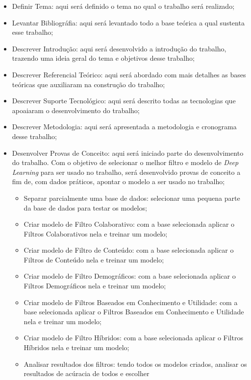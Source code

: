 \begin{itemize}
\item Definir Tema: aqui será definido o tema no qual o trabalho será realizado;
\item Levantar Bibliográfia: aqui será levantado todo a base teórica a qual sustenta esse trabalho;
\item Descrever Introdução: aqui será desenvolvido a introdução do trabalho, trazendo uma ideia geral do tema e objetivos 
desse trabalho;
\item Descrever Referencial Teórico: aqui será abordado com mais detalhes as bases teóricas que auxiliaram na construção
do trabalho;
\item Descrever Suporte Tecnológico: aqui será descrito todas as tecnologias que apoaiaram o desenvolvimento do trabalho;
\item Descrever Metodologia: aqui será apresentada a metodologia e cronograma desse trabalho;
\item Desenvolver Provas de Conceito: aqui será iniciado parte do desenvolvimento do trabalho. Com o objetivo de selecionar
o melhor filtro e modelo de \textit{Deep Learning} para ser usado no trabalho, será desenvolvido provas de conceito a fim de,
com dados práticos, apontar o modelo a ser usado no trabalho;
    \begin{itemize}
        \item Separar parcialmente uma base de dados: selecionar uma pequena parte da base de dados para testar os modelos;
        \item Criar modelo de Filtro Colaborativo: com a base selecionada aplicar o Filtros Colaborativos nela e treinar um modelo;
        \item Criar modelo de Filtro de Conteúdo: com a base selecionada aplicar o Filtros de Conteúdo nela e treinar um modelo;
        \item Criar modelo de Filtro Demográficos: com a base selecionada aplicar o Filtros Demográficos nela e treinar um modelo;
        \item Criar modelo de Filtros Baseados em Conhecimento e Utilidade: com a base selecionada aplicar
         o Filtros Baseados em Conhecimento e Utilidade nela e treinar um modelo;
        \item Criar modelo de Filtro Híbridos: com a base selecionada aplicar o Filtros Híbridos nela e treinar um modelo;
        \item Analisar resultados dos filtros: tendo todos os modelos criados, analisar os resultados de acúracia de todos e escolher 

\end{itemize}
\end{itemize}
